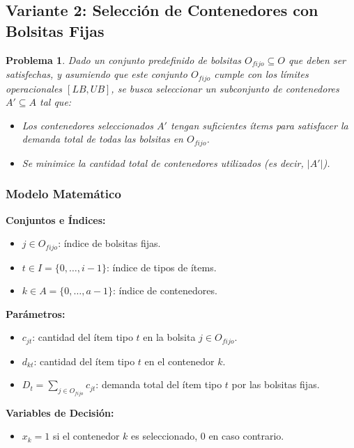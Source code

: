 \documentclass[a4paper,12pt]{article}
\newtheorem{problem}{Problema}
\begin{document}
\subsection{Variante 2: Selección de Contenedores con Bolsitas Fijas}
\label{sec:variante2}
\begin{problem}
Dado un conjunto predefinido de bolsitas $O_{fijo} \subseteq O$ que deben ser satisfechas, y asumiendo que este conjunto $O_{fijo}$ cumple con los límites operacionales $[LB, UB]$, se busca seleccionar un subconjunto de contenedores $A' \subseteq A$ tal que:
\begin{itemize}
    \item Los contenedores seleccionados $A'$ tengan suficientes ítems para satisfacer la demanda total de todas las bolsitas en $O_{fijo}$.
    \item Se minimice la cantidad total de contenedores utilizados (es decir, $|A'|$).
\end{itemize}
\end{problem}

\subsubsection{Modelo Matemático}
\textbf{Conjuntos e Índices:}
\begin{itemize}
    \item $j \in O_{fijo}$: índice de bolsitas fijas.
    \item $t \in I = \{0, \dots, i-1\}$: índice de tipos de ítems.
    \item $k \in A = \{0, \dots, a-1\}$: índice de contenedores.
\end{itemize}

\textbf{Parámetros:}
\begin{itemize}
    \item $c_{jt}$: cantidad del ítem tipo $t$ en la bolsita $j \in O_{fijo}$.
    \item $d_{kt}$: cantidad del ítem tipo $t$ en el contenedor $k$.
    \item $D_t = \sum_{j \in O_{fijo}} c_{jt}$: demanda total del ítem tipo $t$ por las bolsitas fijas.
\end{itemize}

\textbf{Variables de Decisión:}
\begin{itemize}
    \item $x_k = 1$ si el contenedor $k$ es seleccionado, $0$ en caso contrario.
\end{itemize}
\end{document}
